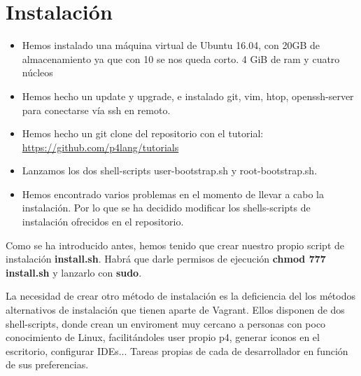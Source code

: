 \section{Instalación}
\begin{itemize}
    \item Hemos instalado una máquina virtual de Ubuntu 16.04, con 20GB de almacenamiento ya que con 10 se nos queda corto. 4 GiB de ram y cuatro núcleos
    
    \item Hemos hecho un update y upgrade, e instalado git, vim, htop, openssh-server para conectarse vía ssh en remoto.
    
    \item Hemos hecho un git clone del repositorio con el tutorial:
    \url{https://github.com/p4lang/tutorials}
    
    \item Lanzamos los dos shell-scripts user-bootstrap.sh y root-bootstrap.sh. 
    \item Hemos encontrado varios problemas en el momento de llevar a cabo la instalación. Por lo que se ha decidido modificar los shells-scripts de instalación ofrecidos en el repositorio.
\end{itemize}

Como se ha introducido antes, hemos tenido que crear nuestro propio script de instalación \textbf{install.sh}. Habrá que darle permisos de ejecución \textbf{chmod 777 install.sh} y lanzarlo con \textbf{sudo}. \newline
\newline

La necesidad de crear otro método de instalación es la deficiencia del los métodos alternativos de instalación que tienen aparte de Vagrant. Ellos disponen de dos shell-scripts, donde crean un enviroment muy cercano a personas con poco conocimiento de Linux, facilitándoles user propio p4, generar iconos en el escritorio, configurar IDEs... Tareas propias de cada de desarrollador en función de sus preferencias. \newline
\newline

